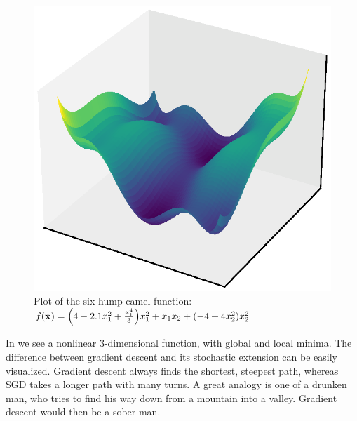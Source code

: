     \begin{minipage}{0.45\textwidth}
        \centering
        \begin{figure}[H]
            \centering
            \label{fig:six-hump-camel-function}
            \includegraphics*[width=\textwidth]{./deep-learning/six-hump-camel-function-resized.eps}
            \caption{Plot of the six hump camel function: \( f(\mathbf{x}) = \Big( 4 - 2.1 x^{2}_{1} + \frac{x^{4}_{1}}{3} \Big) x^{2}_{1} + x_{1}x_{2} + (-4 + 4x^{2}_{2}) x^{2}_{2} \)}
        \end{figure}
    \end{minipage}\hfill
    \begin{minipage}{0.45\textwidth}        
        In  we see a nonlinear \(3\)-dimensional function, with global and local minima.
        The difference between gradient descent and its stochastic extension can be easily visualized.
        Gradient descent always finds the shortest, steepest path, whereas SGD takes a longer path with many turns.
        A great analogy is one of a drunken man, who tries to find his way down from a mountain into a valley.
        Gradient descent would then be a sober man.
    \end{minipage}
